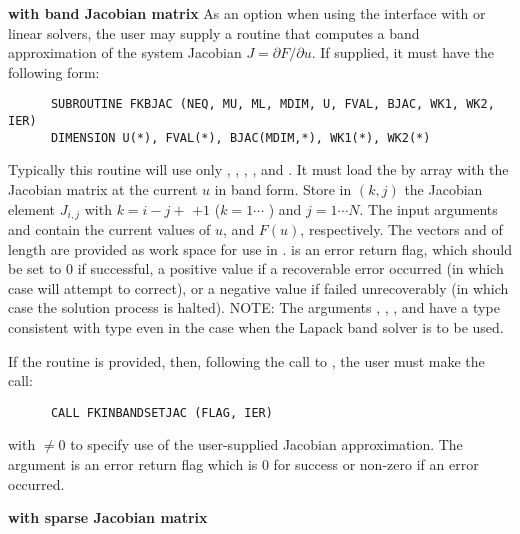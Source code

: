 \begin{Steps}

  {\bf {\kindls} with band Jacobian matrix}
  As an option when using the {\kindls} interface with 
  {\sunlinsolband} or {\sunlinsollapband} linear solvers, the user may supply a
  routine that computes a band approximation of the system Jacobian 
  $J = \partial F / \partial u$. If supplied, it must have the following form:
\begin{verbatim}
      SUBROUTINE FKBJAC (NEQ, MU, ML, MDIM, U, FVAL, BJAC, WK1, WK2, IER)
      DIMENSION U(*), FVAL(*), BJAC(MDIM,*), WK1(*), WK2(*)
\end{verbatim}
  Typically this routine will use only , , ,
  , and .
  It must load the  by  array  with the Jacobian matrix
  at the current $u$ in band form.  Store in $(k,j)$ the Jacobian
  element $J_{i,j}$ with $k = i - j + $  $ + 1$ ($k = 1 \cdots $
  ) and $j = 1 \cdots N$.
  The input arguments  and  contain the current
  values of $u$, and $F(u)$, respectively.
  The vectors  and 
  of length  are provided as work space for use in
  .
   is an error return flag, which should be set to $0$ if successful,
  a positive value if a recoverable error occurred (in which case {\kinsol} will
  attempt to correct), or a negative value if  failed unrecoverably
  (in which case the solution process is halted).
  NOTE: The arguments , , , and  have a type
  consistent with {\CC} type  even in the case when the Lapack band
  solver is to be used.

  If the  routine is provided, then, following the call to ,
  the user must make the call:
\begin{verbatim}
      CALL FKINBANDSETJAC (FLAG, IER)
\end{verbatim}
  with  $\neq 0$ to specify use of the user-supplied Jacobian approximation.
  The argument  is an error return flag which is $0$ 
  for success or non-zero if an error occurred.


  {\bf {\kindls} with sparse Jacobian matrix} 


\end{Steps}
